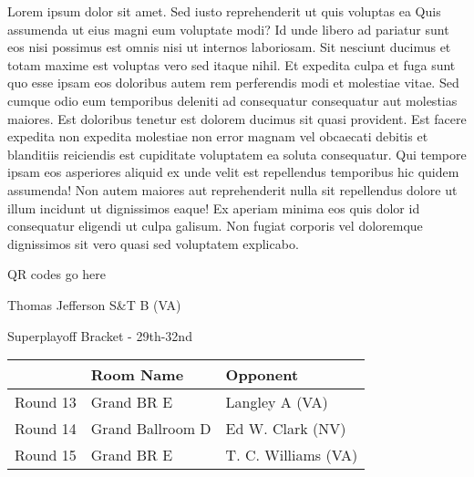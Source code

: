 \documentclass{article}%
\begin{document}
\vspace*{8pt}%
\linebreak%
\newline%
\newline%
Lorem ipsum dolor sit amet. Sed iusto reprehenderit ut quis voluptas ea Quis assumenda ut eius magni eum voluptate modi? Id unde libero ad pariatur sunt eos nisi possimus est omnis nisi ut internos laboriosam. Sit nesciunt ducimus et totam maxime est voluptas vero sed itaque nihil. Et expedita culpa et fuga sunt quo esse ipsam eos doloribus autem rem perferendis modi et molestiae vitae.\newline%
\newline%
Sed cumque odio eum temporibus deleniti ad consequatur consequatur aut molestias maiores. Est doloribus tenetur est dolorem ducimus sit quasi provident. Est facere expedita non expedita molestiae non error magnam vel obcaecati debitis et blanditiis reiciendis est cupiditate voluptatem ea soluta consequatur. Qui tempore ipsam eos asperiores aliquid ex unde velit est repellendus temporibus hic quidem assumenda!\newline%
\newline%
Non autem maiores aut reprehenderit nulla sit repellendus dolore ut illum incidunt ut dignissimos eaque! Ex aperiam minima eos quis dolor id consequatur eligendi ut culpa galisum. Non fugiat corporis vel doloremque dignissimos sit vero quasi sed voluptatem explicabo.\newline%
\newline%
%
\vspace*{30pt}%
\begin{center}%
\begin{Huge}%
QR codes go here%
\end{Huge}%
\end{center}%
\newpage%
\begin{center}%
\begin{Huge}%
Thomas Jefferson S\&T B (VA)%
\end{Huge}%
\vspace*{8pt}%
\linebreak%
\begin{Large}%
Superplayoff Bracket {-} 29th{-}32nd%
\end{Large}%
\end{center}%
%
\begin{tabularx}{\textwidth}{|c|Y|Y|}%
\hline%
&Room Name&Opponent\\%
\hline%
Round 13&Grand BR E&Langley A (VA)\\%
Round 14&Grand Ballroom D&Ed W. Clark (NV)\\%
Round 15&Grand BR E&T. C. Williams (VA)\\%
\hline%
\end{tabularx}%
\end{document}
